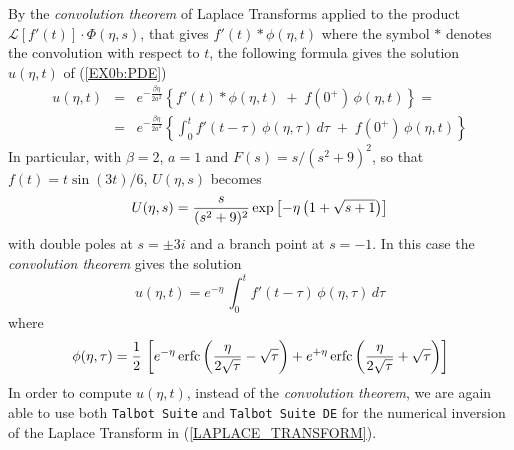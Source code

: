 \documentclass[a4paper,10pt]{report}%
\begin{document}
By the {\em convolution theorem} of Laplace Transforms applied to the product $\mathscr{L}\left[f'(t)\right]\cdot\Phi(\eta,s)$, that gives $f'(t)\,{\mathbb *}\,\phi(\eta,t)$ where the symbol ${\mathbb *}$ denotes the convolution with respect to $t$, the following formula gives the solution $u(\eta,t)$ of (\ref{EX0b:PDE})
\[\begin{array}{lcl}
u(\eta,t) &=& e^{-\frac{\beta\eta}{2a^2}} \left\{ f'(t)\,{\mathbb *}\,\phi(\eta,t) \;+\; f(0^+)\,\phi(\eta,t) \right\} = \\[8pt]
          &=& e^{-\frac{\beta\eta}{2a^2}} \left\{ \displaystyle{\int_0^t{f'(t-\tau)\,\phi(\eta,\tau)\,d\tau}} \;+\; f(0^+)\,\phi(\eta,t) \right\}
\end{array}\]
In particular, with $\beta=2$, $a=1$ and $F(s) = s/(s^2+9)^2$, so that $f(t)=t\sin(3t)/6$, 
$U(\eta,s)$ becomes
\begin{equation}\label{LAPLACE_TRANSFORM}
U(\eta,s) = \frac{s}{(s^2+9)^2}\,{\rm exp}\left[-\eta\left(1+\sqrt{s+1}\right)\right]
\end{equation}
with double poles at $s=\pm 3i$ and a branch point at $s=-1$.
In this case the {\em convolution theorem} gives the solution
\begin{equation}\label{CONVOLUTION}
u(\eta,t) = e^{-\eta}\,\int_0^t{f'(t-\tau)\,\phi(\eta,\tau)\,d\tau}
\end{equation}
where
\[
\phi(\eta,\tau) = \frac{1}{2}\,\left[ e^{-\eta}\,{\rm erfc}\left( \frac{\eta}{2\sqrt{\tau}} - \sqrt{\tau} \right) + e^{+\eta}\,{\rm erfc}\left( \frac{\eta}{2\sqrt{\tau}} + \sqrt{\tau} \right) \right]
\]
In order to compute $u(\eta,t)$, instead of the {\em convolution theorem}, we are again able to use both
{\tt Talbot Suite} and {\tt Talbot Suite DE} for the numerical inversion of the Laplace Transform in
(\ref{LAPLACE_TRANSFORM}).
\end{document}
